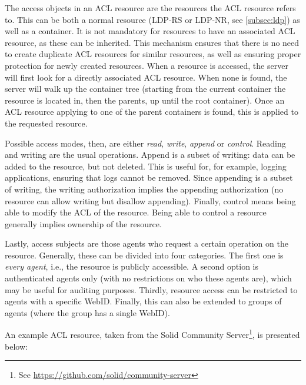 The access objects in an ACL resource are the resources the ACL resource refers to. This can be both a normal resource (LDP-RS or LDP-NR, see \ref{subsec:ldp}) as well as a container. It is not mandatory for resources to have an associated ACL resource, as these can be inherited. This mechanism ensures that there is no need to create duplicate ACL resources for similar resources, as well as ensuring proper protection for newly created resources. When a resource is accessed, the server will first look for a directly associated ACL resource. When none is found, the server will walk up the container tree (starting from the current container the resource is located in, then the parents, up until the root container). Once an ACL resource applying to one of the parent containers is found, this is applied to the requested resource.

Possible access modes, then, are either \textit{read}, \textit{write}, \textit{append} or \textit{control}. Reading and writing are the usual operations. Append is a subset of writing: data can be added to the resource, but not deleted. This is useful for, for example, logging applications, ensuring that logs cannot be removed. Since appending is a subset of writing, the writing authorization implies the appending authorization (no resource can allow writing but disallow appending). Finally, control means being able to modify the ACL of the resource. Being able to control a resource generally implies ownership of the resource.

Lastly, access subjects are those agents who request a certain operation on the resource. Generally, these can be divided into four categories. The first one is \textit{every agent}, i.e., the resource is publicly accessible. A second option is authenticated agents only (with no restrictions on who these agents are), which may be useful for auditing purposes. Thirdly, resource access can be restricted to agents with a specific WebID. Finally, this can also be extended to groups of agents (where the group has a single WebID).

An example ACL resource, taken from the Solid Community Server\footnote{See \url{https://github.com/solid/community-server}}, is presented below:


